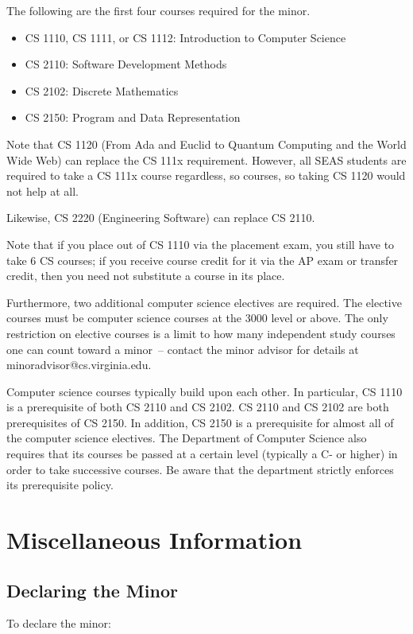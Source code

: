 \documentclass[10pt,letter]{book}
\makeatletter
\newenvironment{itemlist}{
\begin{itemize}
\setlength{\itemsep}{0pt}
\setlength{\parskip}{0pt}}
{\end{itemize}}
\newcommand{\csminoradvisoremail}{minoradvisor@cs.virginia.edu}
\newcommand{\mysection}[1]{\section{#1}\renewcommand{\rightmark}{#1}}
\makeatother
\begin{document}
The following are the first four courses required for the minor.

\begin{itemlist} 
\item CS 1110, CS 1111, or CS 1112: Introduction
  to Computer Science
\item CS 2110: Software Development Methods
\item CS 2102: Discrete Mathematics
\item CS 2150: Program and Data Representation
\end{itemlist}

Note that CS 1120 (From Ada and Euclid to Quantum Computing and the
World Wide Web) can replace the CS 111x requirement.  However, all
SEAS students are required to take a CS 111x course regardless, so
courses, so taking CS 1120 would not help at all.

Likewise, CS 2220 (Engineering Software) can replace CS 2110.

Note that if you place out of CS 1110 via the placement exam,
you still have to take 6 CS courses; if you receive course credit for
it via the AP exam or transfer credit, then you need not substitute a
course in its place.

Furthermore, two additional computer science electives are
required. The elective courses must be computer science courses at the
3000 level or above. The only restriction on elective courses is a
limit to how many independent study courses one can count toward a
minor~-- contact the minor advisor for details at
\csminoradvisoremail.

Computer science courses typically build upon each other. In
particular, CS 1110 is a prerequisite of both CS 2110 and
CS 2102. CS 2110 and CS 2102 are both prerequisites
of CS 2150. In addition, CS 2150 is a prerequisite for
almost all of the computer science electives. The Department of
Computer Science also requires that its courses be passed at a certain
level (typically a C- or higher) in order to take successive
courses. Be aware that the department strictly enforces its
prerequisite policy.

 
\mysection{Miscellaneous Information}
\subsection{Declaring the Minor}

To declare the minor:
\end{document}
